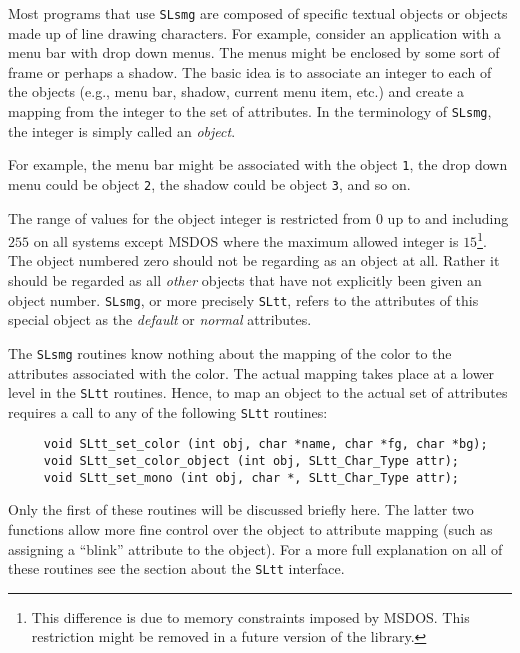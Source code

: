   Most programs that use \verb|SLsmg| are composed of specific textual
  objects or objects made up of line drawing characters. For example,
  consider an application with a menu bar with drop down menus.  The menus
  might be enclosed by some sort of frame or perhaps a shadow.  The basic
  idea is to associate an integer to each of the objects (e.g., menu bar,
  shadow, current menu item, etc.) and create a mapping from the integer to
  the set of attributes.  In the terminology of \verb|SLsmg|, the integer is
  simply called an {\em object}.

  For example, the menu bar might be associated with the object \verb|1|, the
  drop down menu could be object \verb|2|, the shadow could be object \verb|3|,
  and so on.

  The range of values for the object integer is restricted from $0$ up to
  and including $255$ on all systems except MSDOS where the maximum allowed
  integer is $15$\footnote{This difference is due to memory constraints
  imposed by MSDOS.  This restriction might be removed in a future version of
  the library.}. The object numbered zero should not be regarding as an
  object at all.  Rather it should be regarded as all {\em other} objects
  that have not explicitly been given an object number.  \verb|SLsmg|, or
  more precisely \verb|SLtt|, refers to the attributes of this special object
  as the {\em default} or {\em normal} attributes.

  The \verb|SLsmg| routines know nothing about the mapping of the color to the
  attributes associated with the color.  The actual mapping takes place at a
  lower level in the \verb|SLtt| routines.  Hence, to map an object to the
  actual set of attributes requires a call to any of the following \verb|SLtt|
  routines:
\begin{verbatim}   
     void SLtt_set_color (int obj, char *name, char *fg, char *bg);
     void SLtt_set_color_object (int obj, SLtt_Char_Type attr);
     void SLtt_set_mono (int obj, char *, SLtt_Char_Type attr);
\end{verbatim}
  Only the first of these routines will be discussed briefly here.  The
  latter two functions allow more fine control over the object to attribute
  mapping (such as assigning a ``blink'' attribute to the object).  For a
  more full explanation on all of these routines see the section about the
  \verb|SLtt| interface.

